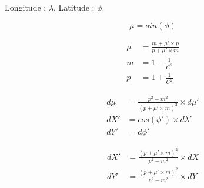 \documentclass[12pt]{article}
\begin{document}
Longitude : $ \lambda $. Latitude : $ \phi $.

\begin{equation*}
\mu = sin \left(\phi\right)
\end{equation*}

\begin{align*}
\mu &= \frac{m + \mu' \times p}{p + \mu' \times m} \\
m &= 1 - \frac{1}{C^2} \\
p &= 1 + \frac{1}{C^2}
\end{align*}

\begin{align*}
d\mu &= \frac{p^2 - m^2}{\left(p + \mu' \times m\right)^2} \times d\mu' \\
dX' &= cos \left(\phi'\right) \times d\lambda' \\
dY' &= d\phi'
\end{align*}

\begin{align*}
dX' &= \frac{\left(p + \mu' \times m\right)^2}{p^2 - m^2} \times dX \\
dY' &= \frac{\left(p + \mu' \times m\right)^2}{p^2 - m^2} \times dY
\end{align*}
\end{document}
